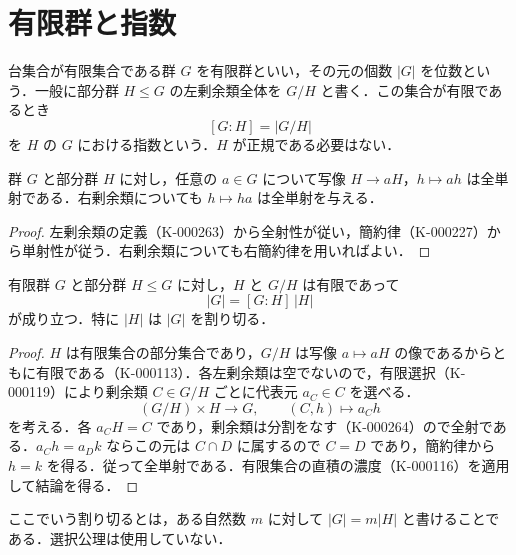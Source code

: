 \section{有限群と指数}
\begin{defn}[有限群と部分群の指数]
台集合が有限集合である群 $G$ を有限群といい，その元の個数 $|G|$ を位数という．一般に部分群 $H\leq G$ の左剰余類全体を $G/H$ と書く．この集合が有限であるとき
\[
[G:H]=|G/H|
\]
を $H$ の $G$ における指数という．$H$ が正規である必要はない．
\end{defn}
\begin{prop}[剰余類の濃度]
群 $G$ と部分群 $H$ に対し，任意の $a\in G$ について写像 $H\to aH$，$h\mapsto ah$ は全単射である．右剰余類についても $h\mapsto ha$ は全単射を与える．
\end{prop}
\begin{proof}
左剰余類の定義（K-000263）から全射性が従い，簡約律（K-000227）から単射性が従う．右剰余類についても右簡約律を用いればよい．
\end{proof}
\begin{thm}[Lagrangeの定理]
有限群 $G$ と部分群 $H\leq G$ に対し，$H$ と $G/H$ は有限であって
\[
|G|=[G:H]\,|H|
\]
が成り立つ．特に $|H|$ は $|G|$ を割り切る．
\end{thm}
\begin{proof}
$H$ は有限集合の部分集合であり，$G/H$ は写像 $a\mapsto aH$ の像であるからともに有限である（K-000113）．各左剰余類は空でないので，有限選択（K-000119）により剰余類 $C\in G/H$ ごとに代表元 $a_C\in C$ を選べる．
\[
(G/H)\times H\longrightarrow G,\qquad (C,h)\longmapsto a_Ch
\]
を考える．各 $a_CH=C$ であり，剰余類は分割をなす（K-000264）ので全射である．$a_Ch=a_Dk$ ならこの元は $C\cap D$ に属するので $C=D$ であり，簡約律から $h=k$ を得る．従って全単射である．有限集合の直積の濃度（K-000116）を適用して結論を得る．
\end{proof}
ここでいう割り切るとは，ある自然数 $m$ に対して $|G|=m|H|$ と書けることである．選択公理は使用していない．
